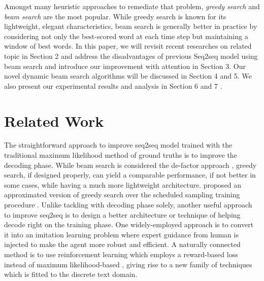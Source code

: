 \documentclass[11pt,a4paper]{article}
\begin{document}
Amongst many heuristic approaches to remediate that problem, \textit{greedy search} and \textit{beam search} are the most popular. While greedy search is known for its lightweight, elegant characteristics, beam search is generally better in practice by considering not only the best-scored word at each time step but maintaining a window of best words. 
In this paper, we will revisit recent researches on related topic in Section 2 and address the disadvantages of previous Seq2seq model using beam search and introduce our improvement with attention in Section 3. Our novel dynamic beam search algorithms will be discussed in Section 4 and 5. We also present our experimental results and analysis in Section 6 and 7	.
\section{Related Work} \label{sec:related_work}%
The straightforward approach to improve seq2seq model trained with the traditional maximum likelihood method  of ground truths is to improve the decoding phase. While beam search is considered the de-factor approach \cite{seq2seq_2014}, greedy search, if designed properly, can yield a comparable performance, if not better in some cases, while having a much more lightweight architecture. \citet{goyal2017differentiable} proposed an approximated version of greedy search over the scheduled sampling training procedure \cite{bengio2015scheduled}. 
Unlike tackling with decoding phase solely, another useful approach to improve seq2seq is to design a better architecture or technique of helping decode right on the training phase. One widely-employed approach is to 
convert it into an imitation learning problem \cite{daume2009search,ross2011reduction,bengio2015scheduled} where expert guidance from human is injected to make the agent more robust and efficient. 
A naturally connected method is to use reinforcement learning \cite{sutton1998reinforcement} which employs a reward-based loss instead of maximum likelihood-based \cite{ranzato2015sequence, gu2017learning}, giving rise to a new family of techniques which is fitted to the discrete text domain. 
\end{document}
